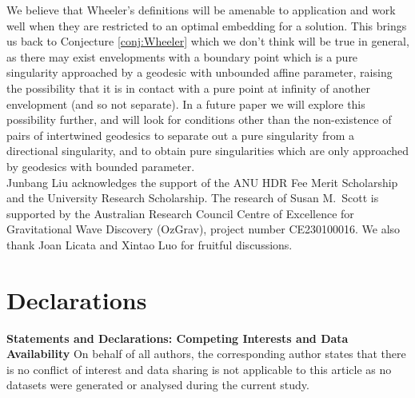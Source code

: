 \documentclass[pdflatex,sn-mathphys-num]{sn-jnl}
\makeatletter
\newcommand{\Junbang}[1]{{\color{magenta}#1}}
\newcommand{\vast}{\bBigg@{2}}
\theoremstyle{definition}
\makeatother
\begin{document}
We believe that Wheeler's definitions will be amenable to application and work well when they are restricted to an optimal embedding for a solution. This brings us back to Conjecture \ref{conj:Wheeler} which we don't think will be true in general, as there may exist envelopments with a boundary point which is a pure singularity approached by a geodesic with unbounded affine parameter, raising the possibility that it is in contact with a pure point at infinity of another envelopment (and so not separate). In a future paper we will explore this possibility further, and will look for conditions other than the non-existence of pairs of intertwined geodesics to separate out a pure singularity from a directional singularity, and to obtain pure singularities which are only approached by geodesics with bounded parameter.\\




Junbang Liu acknowledges the support of the ANU HDR Fee Merit Scholarship and the University Research Scholarship. The research of Susan M.\ Scott is supported by the Australian Research Council Centre of Excellence for Gravitational Wave Discovery (OzGrav), project number CE230100016. We also thank Joan Licata and Xintao Luo for fruitful discussions.

\section*{Declarations} {\bf Statements and Declarations: Competing Interests and Data Availability} On behalf of all authors, the corresponding author states that there is no conflict of interest and data sharing is not applicable to this article as no datasets were generated or analysed during the current study.
\end{document}
